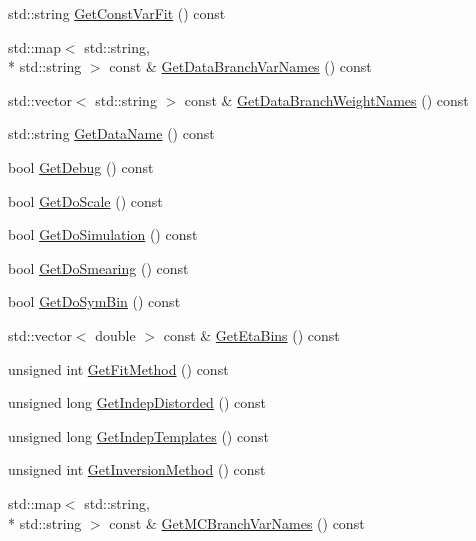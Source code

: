 \begin{DoxyCompactItemize}
\item 
std\+::string \hyperlink{classTemplateMethod_1_1Setting_afa99813c9e9756628ed5e5aa41138cdd}{Get\+Const\+Var\+Fit} () const 
\item 
std\+::map$<$ std\+::string, \\*
std\+::string $>$ const \& \hyperlink{classTemplateMethod_1_1Setting_aac135116da88563675a629c6b91f8c38}{Get\+Data\+Branch\+Var\+Names} () const 
\item 
std\+::vector$<$ std\+::string $>$ const \& \hyperlink{classTemplateMethod_1_1Setting_a677cf84b622bdd89c336bd455b5f2e39}{Get\+Data\+Branch\+Weight\+Names} () const 
\item 
std\+::string \hyperlink{classTemplateMethod_1_1Setting_a550885592b937ce4b5d7d2f6f9fab96b}{Get\+Data\+Name} () const 
\item 
bool \hyperlink{classTemplateMethod_1_1Setting_ae29851d2b3ed36ce76c5384a35c583a1}{Get\+Debug} () const 
\item 
bool \hyperlink{classTemplateMethod_1_1Setting_a85b177edc2a1f80d0230613eb62d3ba1}{Get\+Do\+Scale} () const 
\item 
bool \hyperlink{classTemplateMethod_1_1Setting_a4dc41e8b8bfb48d070fc6729868f5d0c}{Get\+Do\+Simulation} () const 
\item 
bool \hyperlink{classTemplateMethod_1_1Setting_a5ebb05e103a8d8361ba87bc51f26109c}{Get\+Do\+Smearing} () const 
\item 
bool \hyperlink{classTemplateMethod_1_1Setting_a3a47370558ee262714edce6d362299d7}{Get\+Do\+Sym\+Bin} () const 
\item 
std\+::vector$<$ double $>$ const \& \hyperlink{classTemplateMethod_1_1Setting_ab4da72747d79573655b6a2c61c6f37f3}{Get\+Eta\+Bins} () const 
\item 
unsigned int \hyperlink{classTemplateMethod_1_1Setting_aa00554a8d8b68cc1d6c823d13db76440}{Get\+Fit\+Method} () const 
\item 
unsigned long \hyperlink{classTemplateMethod_1_1Setting_a1b715736d3b141405d8109afb81a943e}{Get\+Indep\+Distorded} () const 
\item 
unsigned long \hyperlink{classTemplateMethod_1_1Setting_a72f956208eb4eaaafc8e87958ade86d5}{Get\+Indep\+Templates} () const 
\item 
unsigned int \hyperlink{classTemplateMethod_1_1Setting_aec8b2eeda172b4f767528ee231b93189}{Get\+Inversion\+Method} () const 
\item 
std\+::map$<$ std\+::string, \\*
std\+::string $>$ const \& \hyperlink{classTemplateMethod_1_1Setting_a06a6305d3d53f15a546d447d0e0ac6d4}{Get\+M\+C\+Branch\+Var\+Names} () const 

\end{DoxyCompactItemize}
